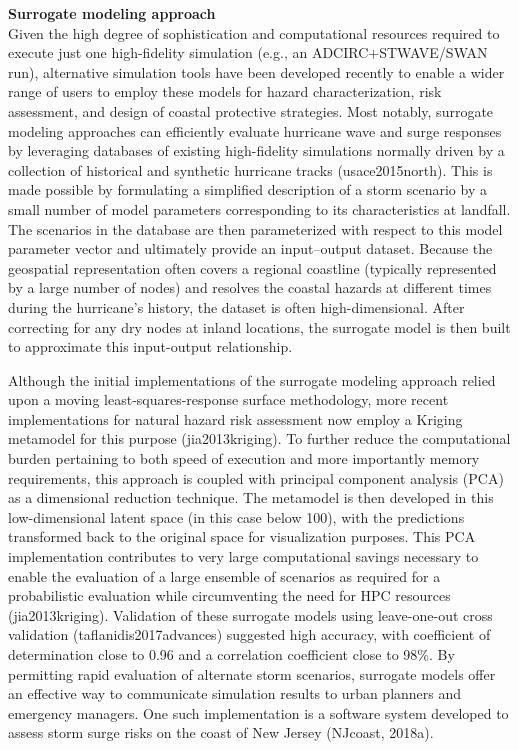 \noindent\textbf{Surrogate modeling approach} \\Given the high degree of sophistication and computational resources required to execute just one high-fidelity simulation (e.g., an ADCIRC+STWAVE/SWAN run), alternative simulation tools have been developed recently to enable a wider range of users to employ these models for hazard characterization, risk assessment, and design of coastal protective strategies. Most notably, surrogate modeling approaches can efficiently evaluate hurricane wave and surge responses by leveraging databases of existing high-fidelity simulations normally driven by a collection of historical and synthetic hurricane tracks (usace2015north). This is made possible by formulating a simplified description of a storm scenario by a small number of model parameters corresponding to its characteristics at landfall. The scenarios in the database are then parameterized with respect to this model parameter vector and ultimately provide an input–output dataset. Because the geospatial representation often covers a regional coastline (typically represented by a large number of nodes) and resolves the coastal hazards at different times during the hurricane’s history, the dataset is often high-dimensional. After correcting for any dry nodes at inland locations, the surrogate model is then built to approximate this input-output relationship.

Although the initial implementations of the surrogate modeling approach relied upon a moving least-squares-response surface methodology, more recent implementations for natural hazard risk assessment now employ a Kriging metamodel for this purpose (jia2013kriging). To further reduce the computational burden pertaining to both speed of execution and more importantly memory requirements, this approach is coupled with principal component analysis (PCA) as a dimensional reduction technique. The metamodel is then developed in this low-dimensional latent space (in this case below 100), with the predictions transformed back to the original space for visualization purposes. This PCA implementation contributes to very large computational savings necessary to enable the evaluation of a large ensemble of scenarios as required for a probabilistic evaluation while circumventing the need for HPC resources (jia2013kriging). Validation of these surrogate models using leave-one-out cross validation (taflanidis2017advances) suggested high accuracy, with coefficient of determination close to 0.96 and a correlation coefficient close to 98\%. By permitting rapid evaluation of alternate storm scenarios, surrogate models offer an effective way to communicate simulation results to urban planners and emergency managers. One such implementation is a software system developed to assess storm surge risks on the coast of New Jersey (NJcoast, 2018a).

